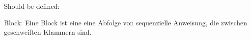 Should be defined:

Block:
Eine Block ist eine eine Abfolge von sequenzielle Anweisung, die 
zwischen geschweiften Klammern sind.
